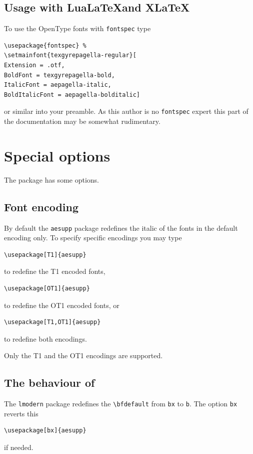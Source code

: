 \documentclass[paper=a4,11pt,english,parskip=half]{scrartcl}
\begin{document}
\subsection{Usage with Lua\LaTeX and
  X\LaTeX}
\label{sec:usage-with-luatex}

To use the OpenType fonts with \texttt{fontspec} type
\begin{lstlisting}
\usepackage{fontspec} %
\setmainfont{texgyrepagella-regular}[
Extension = .otf,
BoldFont = texgyrepagella-bold,
ItalicFont = aepagella-italic,
BoldItalicFont = aepagella-bolditalic]
\end{lstlisting}
or similar into your preamble. As this author is no \texttt{fontspec}
expert this part of the documentation may be somewhat rudimentary.

\section{Special options}
\label{sec:special-options}

The package has some options.

\subsection{Font encoding}
\label{sec:font-encoding}

By default the \texttt{aesupp} package redefines the italic of the
fonts in the default encoding only.  To specify specific encodings you
may type
\begin{lstlisting}
\usepackage[T1]{aesupp}
\end{lstlisting}
to redefine the T1 encoded fonts,
\begin{lstlisting}
\usepackage[OT1]{aesupp}
\end{lstlisting}
to redefine the OT1 encoded fonts, or
\begin{lstlisting}
\usepackage[T1,OT1]{aesupp}
\end{lstlisting}
to redefine both encodings.

Only the T1 and the OT1 encodings are supported.

\subsection{The behaviour of \texttt{\string\bfseries}}
\label{sec:behaviour-bfseries}

The \texttt{lmodern} package redefines the \verb|\bfdefault| from
\texttt{bx} to \texttt{b}. The option \texttt{bx} reverts this
\begin{lstlisting}
\usepackage[bx]{aesupp}
\end{lstlisting}
if needed.
\end{document}
